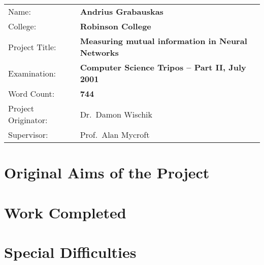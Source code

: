 {\large
\begin{tabular}{ll}
Name:               & \bf Andrius Grabauskas                    \\
College:            & \bf Robinson College                      \\
Project Title:      & \bf Measuring mutual information in Neural Networks \\
Examination:        & \bf Computer Science Tripos -- Part II, July 2001  \\
Word Count:         & \bf 744\footnotemark[1] \\
Project Originator: & Dr.\ Damon Wischik                  \\
Supervisor:         & Prof.\ Alan Mycroft                 \\ 
\end{tabular}
}


\section*{Original Aims of the Project}

\section*{Work Completed}

\section*{Special Difficulties}

\newpage
